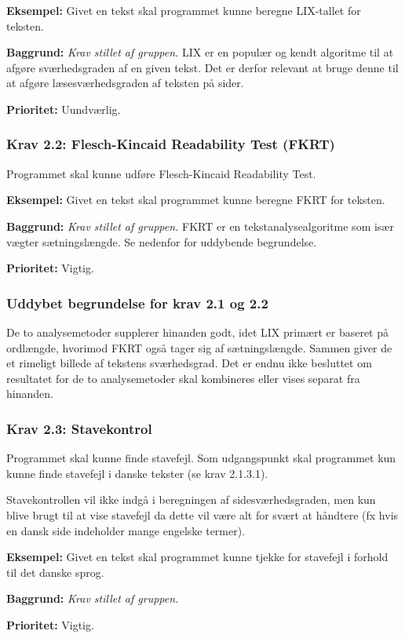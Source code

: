\documentclass[a4paper,oneside,article, titlepage]{article}
\begin{document}
\begin{description}
\item \textbf{Eksempel:} Givet en tekst skal programmet kunne beregne
  LIX-tallet for teksten.
\item \textbf{Baggrund:} \textit{Krav stillet af gruppen.} LIX er en
  populær og kendt algoritme til at afgøre sværhedsgraden af en given
  tekst. Det er derfor relevant at bruge denne til at afgøre
  læsesværhedsgraden af teksten på sider.
\item \textbf{Prioritet:} Uundværlig.
\end{description}


\subsubsection{Krav 2.2: Flesch-Kincaid Readability Test (FKRT)}
Programmet skal kunne udføre Flesch-Kincaid Readability Test.

\begin{description}
\item \textbf{Eksempel:} Givet en tekst skal programmet kunne beregne
  FKRT for teksten.
\item \textbf{Baggrund:} \textit{Krav stillet af gruppen.} FKRT er en
  tekstanalysealgoritme som især vægter sætningslængde. Se nedenfor
  for uddybende begrundelse.
\item \textbf{Prioritet:} Vigtig.
\end{description}

\subsubsection{Uddybet begrundelse for krav 2.1 og 2.2}
De to analysemetoder supplerer hinanden godt, idet LIX primært er
baseret på ordlængde, hvorimod FKRT også tager sig af
sætningslængde. Sammen giver de et rimeligt billede af tekstens
sværhedsgrad. Det er endnu ikke besluttet om resultatet for de to
analysemetoder skal kombineres eller vises separat fra hinanden.

\subsubsection{Krav 2.3: Stavekontrol}
Programmet skal kunne finde stavefejl. Som udgangspunkt skal
programmet kun kunne finde stavefejl i danske tekster (se krav
2.1.3.1).

Stavekontrollen vil ikke indgå i beregningen af sidesværhedsgraden, men
kun blive brugt til at vise stavefejl da dette vil være alt for svært
at håndtere (fx hvis en dansk side indeholder mange engelske termer).
\begin{description}
\item \textbf{Eksempel:} Givet en tekst skal programmet kunne tjekke
  for stavefejl i forhold til det danske sprog.
\item \textbf{Baggrund:} \textit{Krav stillet af gruppen.} 
\item \textbf{Prioritet:} Vigtig.
\end{description}
\end{document}
